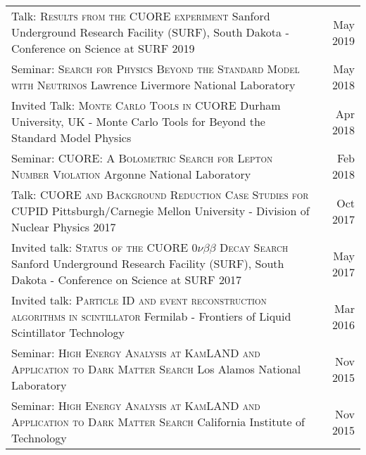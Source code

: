 \documentclass[11pt]{article} %
\begin{document}
\noindent\begin{tabularx}{\linewidth}{@{{}\textbullet\enskip}X@{\quad}r@{}}
Talk: \textsc{Results from the CUORE experiment} \newline Sanford Underground Research Facility (SURF), South Dakota - Conference on Science at SURF 2019 & May 2019\\

\addlinespace[5pt]
Seminar: \textsc{Search for Physics Beyond the Standard Model with Neutrinos} \newline Lawrence Livermore National Laboratory & May  2018\\

\addlinespace[5pt]
Invited Talk: \textsc{Monte Carlo Tools in CUORE} \newline Durham University, UK - Monte Carlo Tools for Beyond the Standard Model Physics & Apr 2018 \\

\addlinespace[5pt]
Seminar: \textsc{CUORE: A Bolometric Search for Lepton Number Violation} \newline Argonne National Laboratory & Feb 2018 \\

\addlinespace[5pt]
Talk: \textsc{CUORE and Background Reduction Case Studies for CUPID} \newline Pittsburgh/Carnegie Mellon University - Division of Nuclear Physics 2017 & Oct 2017 \\

\addlinespace[5pt]
Invited talk: \textsc{Status of the CUORE $0\nu\beta\beta$ Decay Search} \newline Sanford Underground Research Facility (SURF), South Dakota - Conference on Science at SURF 2017 & May 2017 \\

\addlinespace[5pt]
Invited talk: \textsc{Particle ID and event reconstruction algorithms in scintillator} \newline Fermilab - Frontiers of Liquid Scintillator Technology & Mar 2016 \\

\addlinespace[5pt]
Seminar: \textsc{High Energy Analysis at KamLAND and Application to Dark Matter Search} \newline Los Alamos National Laboratory & Nov 2015 \\

\addlinespace[5pt]
Seminar: \textsc{High Energy Analysis at KamLAND and Application to Dark Matter Search} \newline California Institute of Technology & Nov 2015 \\


\end{tabularx}
\end{document}
